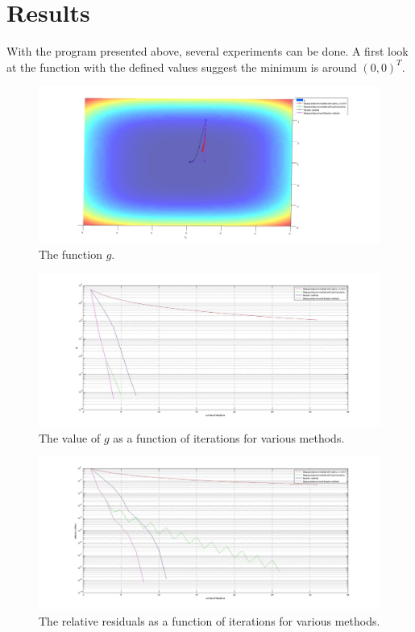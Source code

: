\documentclass[a4paper,12pt]{article}
\begin{document}
\section{Results}
With the program presented above, several experiments can be done. 
A first look at the function with the defined values suggest the minimum is around $(0,0)^T$.
\begin{figure}\label{g}
	\includegraphics[width=\textwidth]{g.jpg}
	\caption{The function $g$.}
\end{figure}
\begin{figure}\label{gvalue}
	\includegraphics[width=\textwidth]{gvalues.jpg}
	\caption{The value of $g$ as a function of iterations for various methods.}
\end{figure}
\begin{figure}\label{res}
	\includegraphics[width=\textwidth]{res.jpg}
	\caption{The relative residuals as a function of iterations for various methods.}
\end{figure}
\end{document}
